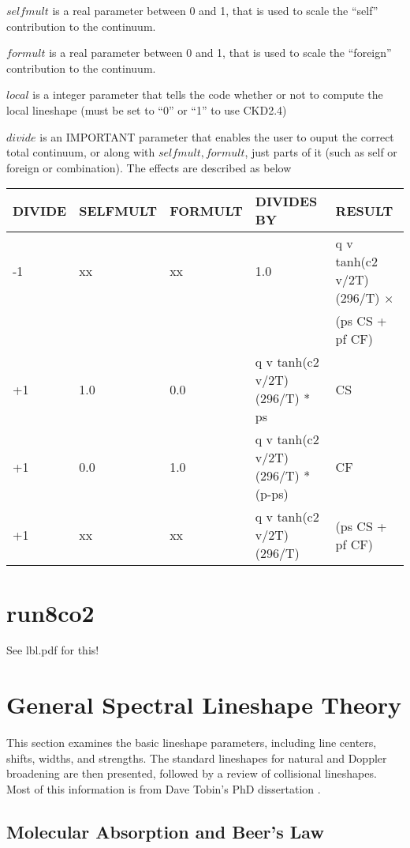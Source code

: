 \documentclass[11pt]{article}
\begin{document}
$selfmult$ is a real parameter between 0 and 1, that is used to scale the
``self'' contribution to the continuum.

$formult$ is a real parameter between 0 and 1, that is used to scale the
``foreign'' contribution to the continuum.

$local$ is a integer parameter that tells the code whether or not to compute
the local lineshape (must be set to ``0'' or ``1'' to use CKD2.4)

$divide$ is an IMPORTANT parameter that enables the user to ouput the correct
total continuum, or along with $selfmult, formult$, just parts of it (such as 
self or foreign or combination). The effects are described as below
\begin{longtable}{lllll}
\hline
\hline
  DIVIDE  &   SELFMULT & FORMULT &  DIVIDES BY & RESULT \\
\hline
\hline
 -1 & xx  & xx  &  1.0 & q v tanh(c2 v/2T) (296/T) $\times$ \\
    &     &     &      & (ps CS + pf CF) \\
 +1 & 1.0 & 0.0 &  q v tanh(c2 v/2T) (296/T) * ps     & CS  \\
 +1 & 0.0 & 1.0 &  q v tanh(c2 v/2T) (296/T) * (p-ps) & CF  \\
 +1 & xx  & xx  &  q v tanh(c2 v/2T) (296/T)          & (ps CS + pf CF) \\
\hline
\hline
\end{longtable}

\section{run8co2}
See lbl.pdf for this!
\newpage

\section{General Spectral Lineshape Theory}\label{chpt:shapes}

This section examines the basic lineshape parameters,
including line centers, shifts, widths, and strengths.  The standard 
lineshapes for natural and Doppler broadening are then presented, followed 
by a review of collisional lineshapes. Most of this information 
is from Dave Tobin's PhD dissertation \cite{tob:96}.

\subsection{Molecular Absorption and Beer's Law}\label{sec:beerslaw}
\end{document}
